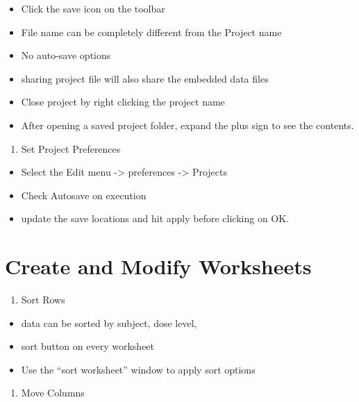 \documentclass[
  letterpaper,
  DIV=11,
  numbers=noendperiod]{scrreprt}
\providecommand{\tightlist}{%
  \setlength{\itemsep}{0pt}\setlength{\parskip}{0pt}}\usepackage{longtable,booktabs,array}
\begin{document}
\begin{itemize}
\tightlist
\item
  Click the save icon on the toolbar
\item
  File name can be completely different from the Project name
\item
  No auto-save options
\item
  sharing project file will also share the embedded data files
\item
  Close project by right clicking the project name
\item
  After opening a saved project folder, expand the plus sign to see the
  contents.
\end{itemize}

\begin{enumerate}
\def\labelenumi{\arabic{enumi}.}
\setcounter{enumi}{4}
\tightlist
\item
  Set Project Preferences
\end{enumerate}

\begin{itemize}
\tightlist
\item
  Select the Edit menu -\textgreater{} preferences -\textgreater{}
  Projects
\item
  Check Autosave on execution
\item
  update the save locations and hit apply before clicking on OK.
\end{itemize}

\hypertarget{create-and-modify-worksheets}{%
\section{Create and Modify
Worksheets}\label{create-and-modify-worksheets}}

\begin{enumerate}
\def\labelenumi{\arabic{enumi}.}
\tightlist
\item
  Sort Rows
\end{enumerate}

\begin{itemize}
\tightlist
\item
  data can be sorted by subject, dose level,
\item
  sort button on every worksheet
\item
  Use the ``sort worksheet'' window to apply sort options
\end{itemize}

\begin{enumerate}
\def\labelenumi{\arabic{enumi}.}
\setcounter{enumi}{1}
\tightlist
\item
  Move Columns
\end{enumerate}
\end{document}
